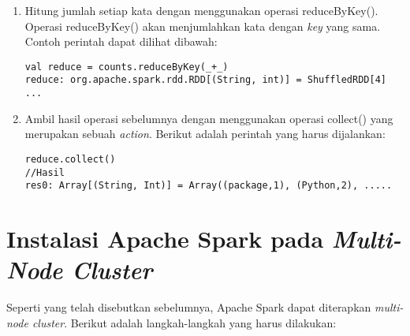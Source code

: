 \begin{enumerate}
\item Hitung jumlah setiap kata dengan menggunakan operasi reduceByKey(). Operasi reduceByKey() akan menjumlahkan kata dengan \textit{key} yang sama. Contoh perintah dapat dilihat dibawah:  

\begin{verbatim}
val reduce = counts.reduceByKey(_+_)
reduce: org.apache.spark.rdd.RDD[(String, int)] = ShuffledRDD[4] ...
\end{verbatim}

\item Ambil hasil operasi sebelumnya dengan menggunakan operasi collect() yang merupakan sebuah \textit{action}. Berikut adalah perintah yang harus dijalankan:

\begin{verbatim}
reduce.collect()
//Hasil
res0: Array[(String, Int)] = Array((package,1), (Python,2), .....
\end{verbatim}

\end{enumerate}

\section{Instalasi Apache Spark pada \textit{Multi-Node Cluster}}

Seperti yang telah disebutkan sebelumnya, Apache Spark dapat diterapkan \textit{ multi-node cluster}. Berikut adalah langkah-langkah yang harus dilakukan:

